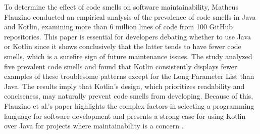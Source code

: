 To determine the effect of code smells on software maintainability, Matheus Flauzino conducted an empirical analysis of the prevalence of code smells in Java and Kotlin, examining more than 6 million lines of code from 100 GitHub repositories. This paper is essential for developers debating whether to use Java or Kotlin since it shows conclusively that the latter tends to have fewer code smells, which is a surefire sign of future maintenance issues. The study analyzed five prevalent code smells and found that Kotlin consistently displays fewer examples of these troublesome patterns except for the Long Parameter List than Java. The results imply that Kotlin's design, which prioritizes readability and conciseness, may naturally prevent code smells from developing. Because of this, Flauzino et al.'s paper highlights the complex factors in selecting a programming language for software development and presents a strong case for using Kotlin over Java for projects where maintainability is a concern \cite{flauzino2018you}. 


